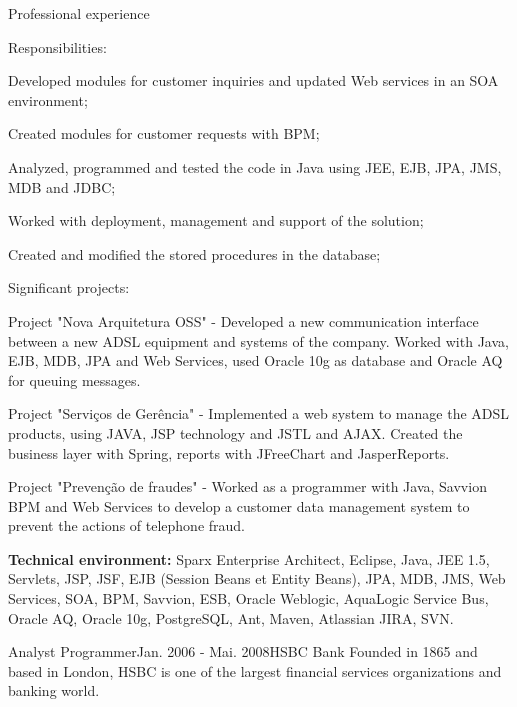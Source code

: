 \documentclass{resume}
\begin{document}
\begin{rSection}{Professional experience}
      \begin{rSubsection}{\fontsize{9}{10}\selectfont Responsibilities:}{}{}{}
        \item Developed modules for customer inquiries and updated Web services in an SOA environment;
        \item Created modules for customer requests with BPM;
        \item Analyzed, programmed and tested the code in Java using JEE, EJB, JPA, JMS, MDB and JDBC;
        \item Worked with deployment, management and support of the solution;
        \item Created and modified the stored procedures in the database;
      \end{rSubsection}

      \begin{rSubsection}{\fontsize{9}{10}\selectfont Significant projects:}{}{}{}
        \item Project "Nova Arquitetura OSS" - Developed a new communication interface between a new ADSL equipment and systems of the company. Worked with Java, EJB, MDB, JPA and Web Services, used Oracle 10g as database and Oracle AQ for queuing messages.
        \item Project "Serviços de Gerência" - Implemented a web system to manage the ADSL products, using JAVA, JSP technology and JSTL and AJAX. Created the business layer with Spring, reports with JFreeChart and JasperReports.
        \item Project "Prevenção de fraudes" - Worked as a programmer with Java, Savvion BPM and Web Services to develop a customer data management system to prevent the actions of telephone fraud.
      \end{rSubsection}
    
      {\fontsize{8}{9}\selectfont \textbf{Technical environment:} Sparx Enterprise Architect, Eclipse, Java, JEE 1.5, Servlets, JSP, JSF, EJB (Session Beans et Entity Beans), JPA, MDB, JMS, Web Services, SOA, BPM, Savvion, ESB, Oracle Weblogic, AquaLogic Service Bus, Oracle AQ, Oracle 10g, PostgreSQL, Ant, Maven, Atlassian JIRA, SVN.} \\
    

    \begin{rSubsection}{\fontsize{12}{14}\selectfont Analyst Programmer}{\fontsize{12}{14}\selectfont Jan. 2006 - Mai. 2008}{\fontsize{12}{14}\selectfont HSBC Bank}{}
    Founded in 1865 and based in London, HSBC is one of the largest financial services organizations and banking world.\\\\


\end{rSubsection}
\end{rSection}
\end{document}
